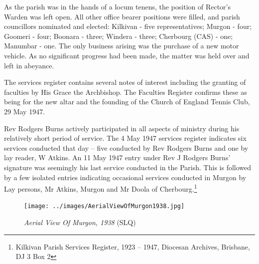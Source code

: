 As the parish was in the hands of a locum tenens, the position of Rector's Warden was left open. All other office bearer positions were filled, and parish councillors nominated and elected: Kilkivan - five representatives; Murgon - four; Goomeri - four; Boonara - three; Windera - three; Cherbourg (CAS) - one; Manumbar - one. The only business arising was the purchase of a new motor vehicle. As no significant progress had been made, the matter was held over and left in abeyance.



The services register contains several notes of interest including the granting of faculties by His Grace the Archbishop. The Faculties Register confirms these as being for the new altar and the founding of the Church of England Tennis Club, 29 May 1947.



Rev Rodgers Burns actively participated in all aspects of ministry during his relatively short period of service. The 4 May 1947 services register indicates six services conducted that day -- five conducted by Rev Rodgers Burns and one by lay reader, W Atkins. An 11 May 1947 entry under Rev J Rodgers Burns' signature was seemingly his last service conducted in the Parish. This is followed by a few isolated entries indicating occasional services conducted in Murgon by Lay persons, Mr Atkins, Murgon and Mr Doola of Cherbourg.\footnote{Kilkivan Parish Services Register, 1923 -- 1947, Diocesan Archives, Brisbane, DJ 3 Box 2}








\begin{figure}[htb]
\begin{center}
\texttt{[image: ../images/AerialViewOfMurgon1938.jpg]}
\caption{{\itshape Aerial View Of Murgon, 1938} {\scriptsize(SLQ)}}
\end{center}
\end{figure}





